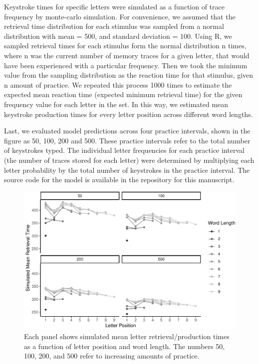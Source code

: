 \documentclass[floatsintext,man]{apa6}
\theoremstyle{definition}
\theoremstyle{definition}
\theoremstyle{definition}
\theoremstyle{remark}
\begin{document}
Keystroke times for specific letters were simulated as a function of
trace frequency by monte-carlo simulation. For convenience, we assumed
that the retrieval time distribution for each stimulus was sampled from
a normal distribution with mean = 500, and standard deviation = 100.
Using R, we sampled retrieval times for each stimulus form the normal
distribution n times, where n was the current number of memory traces
for a given letter, that would have been experienced with a particular
frequency. Then we took the minimum value from the sampling distribution
as the reaction time for that stimulus, given n amount of practice. We
repeated this process 1000 times to estimate the expected mean reaction
time (expected minimum retrieval time) for the given frequency value for
each letter in the set. In this way, we estimated mean keystroke
production times for every letter position across different word
lengths.

Last, we evaluated model predictions across four practice intervals,
shown in the figure as 50, 100, 200 and 500. These practice intervals
refer to the total number of keystrokes typed. The individual letter
frequencies for each practice interval (the number of traces stored for
each letter) were determined by multiplying each letter probability by
the total number of keystrokes in the practice interval. The source code
for the model is available in the repository for this manuscript.






\begin{figure}[htbp]
\centering
\includegraphics{Entropy_typing_draft_files/figure-latex/instance-model-1.pdf}
\caption{\label{fig:instance-model}Each panel shows simulated mean letter
retrieval/production times as a function of letter position and word
length. The numbers 50, 100, 200, and 500 refer to increasing amounts of
practice.}
\end{figure}
\end{document}
